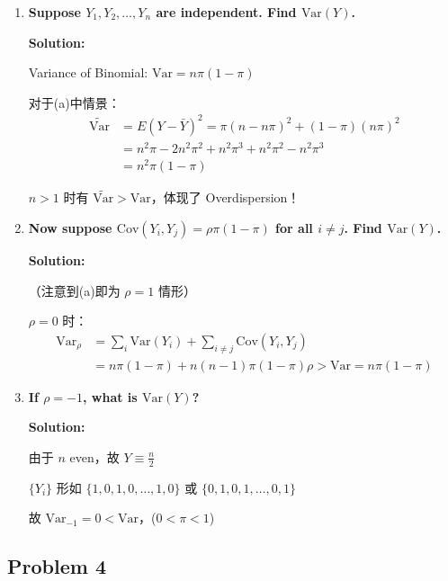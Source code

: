 \begin{enumerate}
\item[(a)] \textbf{Suppose $Y_1, Y_2, \ldots, Y_n$ are independent. Find $\text{Var}(Y)$.}

\textbf{Solution:}

Variance of Binomial: $\text{Var} = n\pi(1-\pi)$

对于(a)中情景：
\begin{align*}
\widetilde{\text{Var}} &= E(Y - \bar{Y})^2 = \pi(n - n\pi)^2 + (1-\pi)(n\pi)^2 \\
&= n^2\pi - 2n^2\pi^2 + n^2\pi^3 + n^2\pi^2 - n^2\pi^3 \\
&= n^2\pi(1-\pi)
\end{align*}

$n > 1$ 时有 $\widetilde{\text{Var}} > \text{Var}$，体现了 Overdispersion！

\bigskip

\item[(b)] \textbf{Now suppose $\text{Cov}(Y_i, Y_j) = \rho \pi(1-\pi)$ for all $i \neq j$. Find $\text{Var}(Y)$.}

\textbf{Solution:}

（注意到(a)即为 $\rho = 1$ 情形）

$\rho = 0$ 时：
\begin{align*}
\text{Var}_{\rho} &= \sum_i \text{Var}(Y_i) + \sum_{i \neq j} \text{Cov}(Y_i, Y_j) \\
&= n\pi(1-\pi) + n(n-1)\pi(1-\pi)\rho > \text{Var} = n\pi(1-\pi)
\end{align*}

\bigskip

\item[(c)] \textbf{If $\rho = -1$, what is $\text{Var}(Y)$?}

\textbf{Solution:}

由于 $n$ even，故 $Y \equiv \frac{n}{2}$

$\{Y_i\}$ 形如 $\{1, 0, 1, 0, \ldots, 1, 0\}$ 或 $\{0, 1, 0, 1, \ldots, 0, 1\}$

故 $\text{Var}_{-1} = 0 < \text{Var}$，($0 < \pi < 1$)
\end{enumerate}

\subsection{Problem 4}

